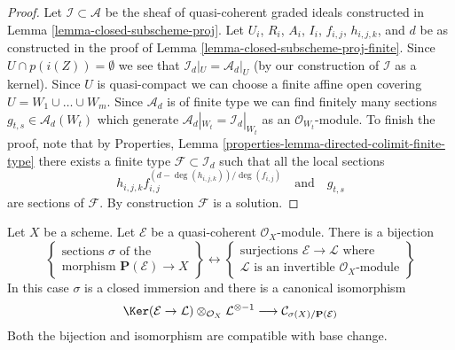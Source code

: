 \begin{proof}
Let $\mathcal{I} \subset \mathcal{A}$ be the sheaf of quasi-coherent
graded ideals constructed in Lemma \ref{lemma-closed-subscheme-proj}.
Let $U_i$, $R_i$, $A_i$, $I_i$, $f_{i, j}$, $h_{i, j, k}$, and $d$
be as constructed in the proof of
Lemma \ref{lemma-closed-subscheme-proj-finite}.
Since $U \cap p(i(Z)) = \emptyset$ we see that
$\mathcal{I}_d|_U = \mathcal{A}_d|_U$ (by our construction of
$\mathcal{I}$ as a kernel). Since $U$ is quasi-compact we
can choose a finite affine open covering $U = W_1 \cup \ldots \cup W_m$.
Since $\mathcal{A}_d$ is of finite type we can find finitely many sections
$g_{t, s} \in \mathcal{A}_d(W_t)$ which generate
$\mathcal{A}_d|_{W_t} = \mathcal{I}_d|_{W_t}$
as an $\mathcal{O}_{W_t}$-module. To finish the proof, note that by
Properties, Lemma \ref{properties-lemma-directed-colimit-finite-type}
there exists a finite type $\mathcal{F} \subset \mathcal{I}_d$
such that all the local sections
$$
h_{i, j, k}f_{i, j}^{(d - \deg(h_{i, j, k}))/\deg(f_{i, j})}
\quad\text{and}\quad
g_{t, s}
$$
are sections of $\mathcal{F}$. By construction $\mathcal{F}$ is a solution.
\end{proof}

\begin{lemma}
\label{lemma-conormal-sheaf-section-projective-bundle}
Let $X$ be a scheme. Let $\mathcal{E}$ be a quasi-coherent
$\mathcal{O}_X$-module. There is a bijection
$$
\left\{
\begin{matrix}
\text{sections }\sigma\text{ of the } \\
\text{morphism } \mathbf{P}(\mathcal{E}) \to X
\end{matrix}
\right\}
\leftrightarrow
\left\{
\begin{matrix}
\text{surjections }\mathcal{E} \to \mathcal{L}\text{ where} \\
\mathcal{L}\text{ is an invertible }\mathcal{O}_X\text{-module}
\end{matrix}
\right\}
$$
In this case $\sigma$ is a closed immersion and there is a canonical
isomorphism
$$
\Ker(\mathcal{E} \to \mathcal{L})
\otimes_{\mathcal{O}_X} \mathcal{L}^{\otimes -1}
\longrightarrow
\mathcal{C}_{\sigma(X)/\mathbf{P}(\mathcal{E})}
$$
Both the bijection and isomorphism are compatible with base change.
\end{lemma}

